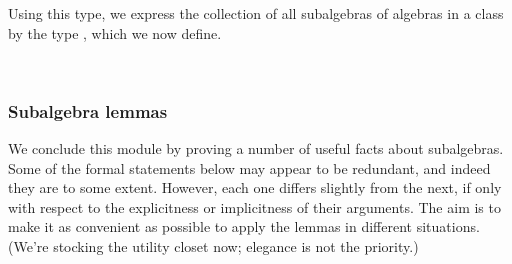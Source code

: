 \ccpad
Using this type, we express the collection of all subalgebras of algebras in a class by the type , which we now define.
\ccpad
\begin{code}%
\>[0]\AgdaSpace{}%
\AgdaSymbol{:}\AgdaSpace{}%
\AgdaSymbol{\{}\AgdaSpace{}%
\AgdaSpace{}%
\AgdaSymbol{:}\AgdaSpace{}%
\AgdaSymbol{\}}\AgdaSpace{}%
\AgdaSpace{}%
\AgdaSpace{}%
\AgdaSymbol{(}\AgdaSpace{}%
\AgdaSpace{}%
\AgdaSymbol{)(}\AgdaSpace{}%
\AgdaSymbol{)}\AgdaSpace{}%
\AgdaSpace{}%
\AgdaSpace{}%
\AgdaSymbol{(}\AgdaSpace{}%
\AgdaSpace{}%
\AgdaSymbol{)}\AgdaSpace{}%
\<%
\\
\>[0]\AgdaSpace{}%
\AgdaSymbol{\{}\AgdaSymbol{\}}\AgdaSpace{}%
\AgdaSpace{}%
\AgdaSymbol{=}\AgdaSpace{}%
\AgdaSpace{}%
\AgdaSpace{}%
\AgdaSpace{}%
\AgdaSpace{}%
\AgdaSpace{}%
\AgdaSpace{}%
\AgdaFunction{,}\AgdaSpace{}%
\AgdaSpace{}%
\AgdaSpace{}%
\<%
\end{code}






\subsubsection{Subalgebra lemmas}\label{subalgebra-lemmas}

We conclude this module by proving a number of useful facts about subalgebras. Some of the formal statements below may appear to be redundant, and indeed they are to some extent. However, each one differs slightly from the next, if only with respect to the explicitness or implicitness of their arguments. The aim is to make it as convenient as possible to apply the lemmas in different situations. (We're stocking the \ualib utility closet now; elegance is not the priority.)

